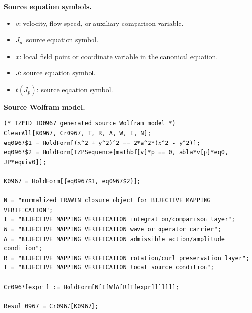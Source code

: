 \begin{minipage}[t]{0.49\linewidth}
\begingroup
\small
\raggedright
\textbf{Source equation symbols.}\par
\begin{itemize}[leftmargin=1.35em,itemsep=1pt,topsep=1pt,parsep=0pt]
    \item $v$: velocity, flow speed, or auxiliary comparison variable.
    \item $J_p$: source equation symbol.
    \item $x$: local field point or coordinate variable in the canonical equation.
    \item $J$: source equation symbol.
    \item $t(J_p)$: source equation symbol.
\end{itemize}
\endgroup
\end{minipage}\hfill
\begin{minipage}[t]{0.47\linewidth}
\begingroup
\scriptsize
\raggedright
\textbf{Source Wolfram model.}\par
\begin{Verbatim}[fontsize=\tiny,breaklines=true,breakanywhere=true]
(* TZPID ID0967 generated source Wolfram model *)
ClearAll[K0967, Cr0967, T, R, A, W, I, N];
eq0967$1 = HoldForm[(x^2 + y^2)^2 == 2*a^2*(x^2 - y^2)];
eq0967$2 = HoldForm[TZPSequence[mathbf[v]*p == 0, abla*v[p]*eq0, JP*equiv0]];

K0967 = HoldForm[{eq0967$1, eq0967$2}];

N = "normalized TRAWIN closure object for BIJECTIVE MAPPING VERIFICATION";
I = "BIJECTIVE MAPPING VERIFICATION integration/comparison layer";
W = "BIJECTIVE MAPPING VERIFICATION wave or operator carrier";
A = "BIJECTIVE MAPPING VERIFICATION admissible action/amplitude condition";
R = "BIJECTIVE MAPPING VERIFICATION rotation/curl preservation layer";
T = "BIJECTIVE MAPPING VERIFICATION local source condition";

Cr0967[expr_] := HoldForm[N[I[W[A[R[T[expr]]]]]]];

Result0967 = Cr0967[K0967];
\end{Verbatim}
\endgroup
\end{minipage}

